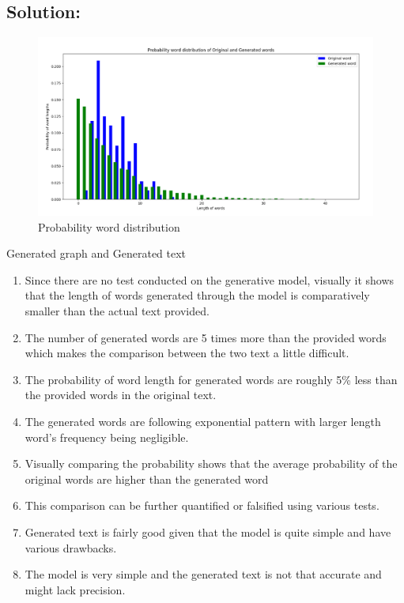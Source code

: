 \documentclass{resources/WeSTassignment}
\begin{document}
\subsection{Solution:}
 \begin{figure}[ht]
    \centering
    \includegraphics[scale=0.4]{./resources/probability_distribution.png}
    \caption{Probability word distribution}
    \label{fig:Probability word distribution}
\end{figure}

Generated graph and Generated text
\begin{enumerate}
	\item Since there are no test conducted on the generative model, visually it shows that the length of words generated through the model is comparatively smaller than the actual text provided.
	\item The number of generated words are 5 times more than the provided words which makes the comparison between the two text a little difficult.
	\item The probability of word length for generated words are roughly 5\% less than the provided words in the original text.
	\item The generated words are following exponential pattern with larger length word's frequency being negligible.
	\item Visually comparing the probability shows that the average probability of the original words are higher than the generated word
	\item This comparison can be further quantified or falsified using various tests.
	\item Generated text is fairly good given that the model is quite simple and have various drawbacks.
	\item The model is very simple and the generated text is not that accurate and might lack precision.
\end{enumerate}
\end{document}
